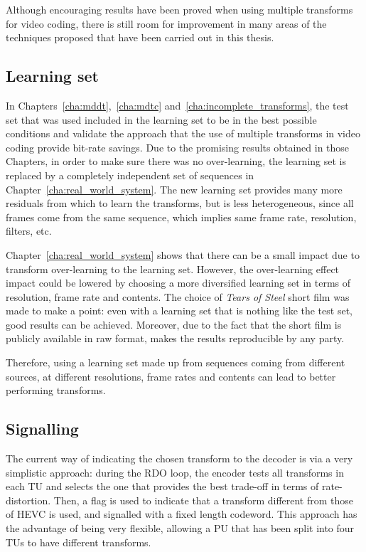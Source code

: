 \documentclass[11pt,a4paper,openright,twoside]{book}
\numberwithin{equation}{section} %
\numberwithin{figure}{section} %
\numberwithin{table}{section} %
\begin{document}
Although encouraging results have been proved when using multiple transforms
for video coding, there is still room for improvement in many areas of the
techniques proposed that have been carried out in this thesis.

\subsection*{Learning set}
\label{sub:learning_set}

In Chapters~\ref{cha:mddt},~\ref{cha:mdtc}
and~\ref{cha:incomplete_transforms}, the test set that was used included in
the learning set to be in the best possible conditions and validate the
approach that the use of multiple transforms in video coding provide bit-rate
savings.
Due to the promising results obtained in those Chapters, in order to make sure
there was no over-learning, the learning set is replaced by a completely
independent set of sequences in Chapter~\ref{cha:real_world_system}.
The new learning set provides many more residuals from which to learn the
transforms, but is less heterogeneous, since all frames come from the same
sequence, which implies same frame rate, resolution, filters, etc.

Chapter~\ref{cha:real_world_system} shows that there can be a small impact
due to transform over-learning to the learning set.
However, the over-learning effect impact could be lowered by choosing a more
diversified learning set in terms of resolution, frame rate and contents.
The choice of \emph{Tears of Steel} short film was made to make a point:
even with a learning set that is nothing like the test set, good results can
be achieved.
Moreover, due to the fact that the short film is publicly available in raw
format, makes the results reproducible by any party.

Therefore, using a learning set made up from sequences coming from different
sources, at different resolutions, frame rates and contents can lead to better
performing transforms.

\subsection*{Signalling}
\label{sub:signalling}

The current way of indicating the chosen transform to the decoder is via a
very simplistic approach:
during the \ac{RDO} loop, the encoder tests all transforms in each \ac{TU} and
selects the one that provides the best trade-off in terms of rate-distortion.
Then, a flag is used to indicate that a transform different from those of
\ac{HEVC} is used, and signalled with a fixed length codeword.
This approach has the advantage of being very flexible, allowing a \ac{PU}
that has been split into four \acp{TU} to have different transforms.
\end{document}
